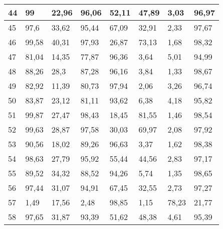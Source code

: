 \begin{longtable}[c]{|l|l|l|l|l|l|l|l|}
44              & 99           & 22,96        & 96,06       & 52,11         & 47,89         & 3,03          & 96,97         \\ \hline
45              & 97,6         & 33,62        & 95,44       & 67,09         & 32,91         & 2,33          & 97,67         \\ \hline
46              & 99,58        & 40,31        & 97,93       & 26,87         & 73,13         & 1,68          & 98,32         \\ \hline
47              & 81,04        & 14,35        & 77,87       & 96,36         & 3,64          & 5,01          & 94,99         \\ \hline
48              & 88,26        & 28,3         & 87,28       & 96,16         & 3,84          & 1,33          & 98,67         \\ \hline
49              & 82,92        & 11,39        & 80,73       & 97,94         & 2,06          & 3,26          & 96,74         \\ \hline
50              & 83,87        & 23,12        & 81,11       & 93,62         & 6,38          & 4,18          & 95,82         \\ \hline
51              & 99,87        & 27,47        & 98,43       & 18,45         & 81,55         & 1,46          & 98,54         \\ \hline
52              & 99,63        & 28,87        & 97,58       & 30,03         & 69,97         & 2,08          & 97,92         \\ \hline
53              & 90,56        & 18,02        & 89,26       & 96,63         & 3,37          & 1,62          & 98,38         \\ \hline
54              & 98,63        & 27,79        & 95,92       & 55,44         & 44,56         & 2,83          & 97,17         \\ \hline
55              & 89,52        & 34,32        & 88,52       & 94,26         & 5,74          & 1,35          & 98,65         \\ \hline
56              & 97,44        & 31,07        & 94,91       & 67,45         & 32,55         & 2,73          & 97,27         \\ \hline
57              & 1,49         & 17,56        & 2,48        & 98,85         & 1,15          & 78,23         & 21,77         \\ \hline
58              & 97,65        & 31,87        & 93,39       & 51,62         & 48,38         & 4,61          & 95,39         \\ \hline

\end{longtable}
